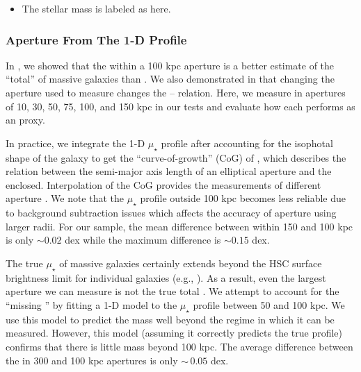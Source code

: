 \documentclass[fleqn,usenatbib,useAMS,english]{mnras}
\begin{document}
    \begin{itemize}
        \item The \cmodel{} stellar mass is labeled as \mcmodel{} here.
    \end{itemize}

\subsubsection{Aperture \mstar{} From The 1-D Profile}
    \label{sec:maper}

    In \citet{Huang2018b}, we showed that the \mstar{} within a 100 kpc aperture is a better estimate
    of the ``total'' \mstar{} of massive galaxies than \mcmodel{}. We also demonstrated in
    \citet{Huang2018c, Huang2020} that changing the aperture used to measure \mstar{} changes the
    \mstar{}--\mvir{} relation.
    Here, we measure \mstar{} in apertures of 10, 30, 50, 75, 100, and 150 kpc in
    our \topn{} tests and evaluate how each performs as an \mvir{} proxy.

    In practice, we integrate the 1-D $\mu_{\star}$ profile after accounting for the isophotal
    shape of the galaxy to get the ``curve-of-growth'' (CoG) of \mstar{}, which describes the relation
    between the semi-major axis length of an elliptical aperture and the \mstar{} enclosed.
    Interpolation of the CoG provides the measurements of different aperture \mstar{}.
    We note that the $\mu_{\star}$ profile outside 100 kpc becomes less reliable due to background
    subtraction issues which affects the accuracy of aperture \mstar{} using larger radii.
    For our sample, the mean difference between \mstar{} within 150 and 100 kpc is only
    $\sim 0.02$ dex while the maximum difference is $\sim 0.15$ dex.

    The true $\mu_{\star}$ of massive galaxies certainly extends beyond the HSC surface
    brightness limit for individual galaxies (e.g., \citealt{Wang2019, Zhang2019, Montes2021,
    Kluge2021}). 
    As a result, even the largest aperture \mstar{} we can measure is not the true total \mstar{}.
    We attempt to account for the ``missing \mstar{}'' by fitting a 1-D \ser{} model to the
    $\mu_{\star}$ profile between 50 and 100 kpc. We use this model to predict the mass well beyond
    the regime in which it can be measured.
    However, this model (assuming it correctly predicts the true profile) confirms that
    there is little mass beyond 100 kpc.
    The average difference between the \mstar{} in 300 and 100 kpc apertures is only $\sim\,0.05$ dex.
\end{document}
